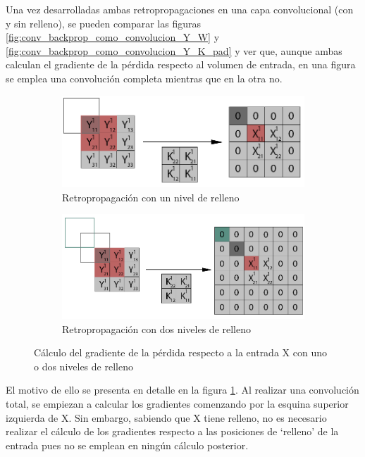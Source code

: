Una vez desarrolladas ambas retropropagaciones en una capa convolucional (con y sin relleno), se pueden comparar las figuras \ref{fig:conv_backprop_como_convolucion_Y_W} y \ref{fig:conv_backprop_como_convolucion_Y_K_pad} y ver que, aunque ambas calculan el gradiente de la pérdida respecto al volumen de entrada, en una figura se emplea una convolución completa mientras que en la otra no.


\begin{figure}[H]
	\centering
	\begin{subfigure}{.5\textwidth}
		\includegraphics[width=1.4\linewidth]{imagenes/full_vs_normal_conv_1.jpg}  
		\caption{Retropropagación con un nivel de relleno}
	\end{subfigure}
	
	\vspace{5mm}
	\begin{subfigure}{.5\textwidth}
		\includegraphics[width=1.4\linewidth]{imagenes/full_vs_normal_conv_2.jpg}  
		\caption{Retropropagación con dos niveles de relleno}
	\end{subfigure}
	\caption{Cálculo del gradiente de la pérdida respecto a la entrada X con uno o dos niveles de relleno}
	\label{fig:conv_full_vs_normal}
\end{figure}

El motivo de ello se presenta en detalle en la figura \ref{fig:conv_full_vs_normal}. Al realizar una convolución total, se empiezan a calcular los gradientes comenzando por la esquina superior izquierda de X. Sin embargo, sabiendo que X tiene relleno, no es necesario realizar el cálculo de los gradientes respecto a las posiciones de `relleno' de la entrada pues no se emplean en ningún cálculo posterior.
